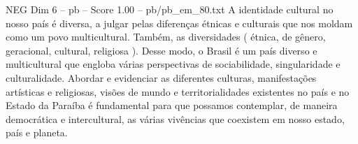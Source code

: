 \begin{textsample}{NEG Dim 6 – pb – Score 1.00 – pb/pb\_em\_80.txt}
A identidade cultural no nosso país é diversa, a julgar pelas diferenças étnicas e culturais que nos moldam como um povo multicultural.
Também, as diversidades ( étnica, de gênero, geracional, cultural, religiosa ).
Desse modo, o Brasil é um país diverso e multicultural que engloba várias perspectivas de sociabilidade, singularidade e culturalidade.
Abordar e evidenciar as diferentes culturas, manifestações artísticas e religiosas, visões de mundo e territorialidades existentes no país e no Estado da Paraíba é fundamental para que possamos contemplar, de maneira democrática e intercultural, as várias vivências que coexistem em nosso estado, país e planeta.

\end{textsample}
